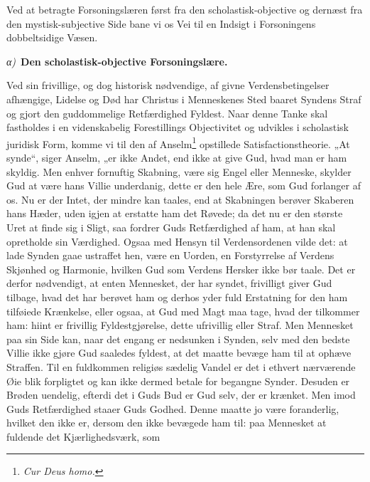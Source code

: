 \documentclass[12pt]{book}
\newcommand{\greekrun}[2]{%
  \medskip\begin{center}{\itshape #1)}\ {\bfseries #2}\end{center}\medskip}
\begin{document}
Ved at betragte Forsoningslæren først fra den scholastisk-objective
og dernæst fra den mystisk-subjective Side bane vi os Vei til en
Indsigt i Forsoningens dobbeltsidige Væsen.

\greekrun{α}{Den scholastisk-objective Forsoningslære.}

Ved sin frivillige, og dog historisk nødvendige, af givne
Verdensbetingelser afhængige, Lidelse og Død har Christus i
Menneskenes Sted baaret Syndens Straf og gjort den guddommelige
Retfærdighed Fyldest. Naar denne Tanke skal fastholdes i en
videnskabelig Forestillings Objectivitet og udvikles i scholastisk
juridisk Form, komme vi til den af Anselm\footnote{\textit{Cur Deus
homo.}} opstillede Satisfactionstheorie. „At synde“, siger Anselm,
„er ikke Andet, end ikke at give Gud, hvad man er ham skyldig. Men
enhver fornuftig Skabning, være sig Engel eller Menneske, skylder
Gud at være hans Villie underdanig, dette er den hele Ære, som Gud
forlanger af os. Nu er der Intet, der mindre kan taales, end at
Skabningen berøver Skaberen hans Hæder, uden igjen at erstatte ham
det Røvede; da det nu er den største Uret at finde sig i Sligt, saa
fordrer Guds Retfærdighed af ham, at han skal opretholde sin
Værdighed. Ogsaa med Hensyn til Verdensordenen vilde det: at lade
Synden gaae ustraffet hen, være en Uorden, en Forstyrrelse af
Verdens Skjønhed og Harmonie, hvilken Gud som Verdens Hersker ikke
bør taale. Det er derfor nødvendigt, at enten Mennesket, der har
syndet, frivilligt giver Gud tilbage, hvad det har berøvet ham og
derhos yder fuld Erstatning for den ham tilføiede Krænkelse, eller
ogsaa, at Gud med Magt maa tage, hvad der tilkommer ham: hiint er
frivillig Fyldestgjørelse, dette ufrivillig eller Straf. Men
Mennesket paa sin Side kan, naar det engang er nedsunken i Synden,
selv med den bedste Villie ikke gjøre Gud saaledes fyldest, at det
maatte bevæge ham til at ophæve Straffen. Til en fuldkommen religiøs
sædelig Vandel er det i ethvert nærværende Øie\-
blik forpligtet og kan ikke dermed betale for begangne Synder.
Desuden er Brøden uendelig, efterdi det i Guds Bud er Gud selv, der
er krænket. Men imod Guds Retfærdighed staaer Guds Godhed. Denne
maatte jo være foranderlig, hvilket den ikke er, dersom den ikke
bevægede ham til: paa Mennesket at fuldende det Kjærlighedsværk, som
\end{document}
